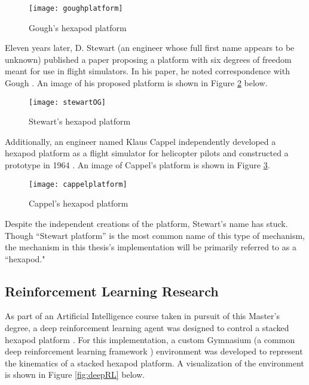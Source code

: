 \documentclass[12pt,a4paper]{report}
\begin{document}
\begin{figure}[htbp]
	\centering
	\texttt{[image: goughplatform]}
	\caption{Gough’s hexapod platform \cite{parallelorigins}}
	\label{fig:goughplatform}
\end{figure}

\vspace{1ex}
Eleven years later, D. Stewart (an engineer whose full first name appears to be unknown) published a paper proposing a platform with six degrees of freedom meant for use in flight simulators. In his paper, he noted correspondence with Gough \cite{stewartpaper}. An image of his proposed platform is shown in Figure \ref{fig:stewartOG} below.

\begin{figure}[htbp]
	\centering
	\texttt{[image: stewartOG]}
	\caption{Stewart’s hexapod platform \cite{stewartpaper}}
	\label{fig:stewartOG}
\end{figure}

Additionally, an engineer named Klaus Cappel independently developed a hexapod platform as a flight simulator for helicopter pilots and constructed a prototype in 1964 \cite{parallelorigins}. An image of Cappel’s platform is shown in Figure \ref{fig:cappelplatform}.

\begin{figure}[htbp]
	\centering
	\texttt{[image: cappelplatform]}
	\caption{Cappel’s hexapod platform \cite{parallelorigins}}
	\label{fig:cappelplatform}
\end{figure}

Despite the independent creations of the platform, Stewart’s name has stuck. Though “Stewart platform” is the most common name of this type of mechanism, the mechanism in this thesis’s implementation will be primarily referred to as a “hexapod."

\subsection{Reinforcement Learning Research} \label{ssec:2s1s2}
As part of an Artificial Intelligence course taken in pursuit of this Master’s degree, a deep reinforcement learning agent was designed to control a stacked hexapod platform \cite{cscpaper}. For this implementation, a custom Gymnasium (a common deep reinforcement learning framework \cite{gymnasium}) environment was developed to represent the kinematics of a stacked hexapod platform. A visualization of the environment is shown in Figure \ref{fig:deepRL} below.
\end{document}
